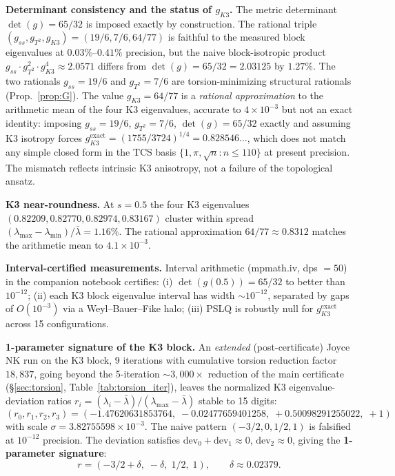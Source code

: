 \documentclass[11pt,a4paper]{article}
\theoremstyle{definition}
\theoremstyle{remark}
\begin{document}
\textbf{Determinant consistency and the status of $g_{K3}$.} The metric determinant $\det(g) = 65/32$ is imposed exactly by construction. The rational triple $(g_{ss}, g_{T^2}, g_{K3}) = (19/6, 7/6, 64/77)$ is faithful to the measured block eigenvalues at $0.03\%$--$0.41\%$ precision, but the naive block-isotropic product $g_{ss} \cdot g_{T^2}^2 \cdot g_{K3}^4 \approx 2.0571$ differs from $\det(g) = 65/32 = 2.03125$ by $1.27\%$. The two rationals $g_{ss} = 19/6$ and $g_{T^2} = 7/6$ are torsion-minimizing structural rationals (Prop.~\ref{prop:G}). The value $g_{K3} = 64/77$ is a \emph{rational approximation} to the arithmetic mean of the four K3 eigenvalues, accurate to $4 \times 10^{-3}$ but not an exact identity: imposing $g_{ss} = 19/6$, $g_{T^2} = 7/6$, $\det(g) = 65/32$ exactly and assuming K3 isotropy forces $g_{K3}^{\mathrm{exact}} = (1755/3724)^{1/4} = 0.828546\ldots$, which does not match any simple closed form in the TCS basis $\{1, \pi, \sqrt{n} : n \leq 110\}$ at present precision. The mismatch reflects intrinsic K3 anisotropy, not a failure of the topological ansatz.

\textbf{K3 near-roundness.} At $s = 0.5$ the four K3 eigenvalues $(0.82209, 0.82770, 0.82974, 0.83167)$ cluster within spread $(\lambda_{\max} - \lambda_{\min})/\bar\lambda = 1.16\%$. The rational approximation $64/77 \approx 0.8312$ matches the arithmetic mean to $4.1 \times 10^{-3}$.

\textbf{Interval-certified measurements.} Interval arithmetic (mpmath.iv, dps $= 50$) in the companion notebook certifies: (i) $\det(g(0.5)) = 65/32$ to better than $10^{-12}$; (ii) each K3 block eigenvalue interval has width $\sim 10^{-12}$, separated by gaps of $O(10^{-3})$ via a Weyl--Bauer--Fike halo; (iii) PSLQ is robustly null for $g_{K3}^{\mathrm{exact}}$ across 15 configurations.

\textbf{1-parameter signature of the K3 block.} An \emph{extended} (post-certificate) Joyce NK run on the K3 block, 9 iterations with cumulative torsion reduction factor $18{,}837$, going beyond the 5-iteration $\sim 3{,}000\times$ reduction of the main certificate (§\ref{sec:torsion}, Table~\ref{tab:torsion_iter}), leaves the normalized K3 eigenvalue-deviation ratios $r_i = (\lambda_i - \bar\lambda)/(\lambda_{\max} - \bar\lambda)$ stable to 15 digits:
\begin{equation}
(r_0, r_1, r_2, r_3) = (-1.47620631853764,\; -0.02477659401258,\; +0.50098291255022,\; +1)
\end{equation}
with scale $\sigma = 3.82755598 \times 10^{-3}$. The naive pattern $(-3/2, 0, 1/2, 1)$ is falsified at $10^{-12}$ precision. The deviation satisfies $\mathrm{dev}_0 + \mathrm{dev}_1 \approx 0$, $\mathrm{dev}_2 \approx 0$, giving the \textbf{1-parameter signature}:
\begin{equation}
r = (-3/2 + \delta,\; -\delta,\; 1/2,\; 1), \qquad \delta \approx 0.02379.
\end{equation}
\end{document}
